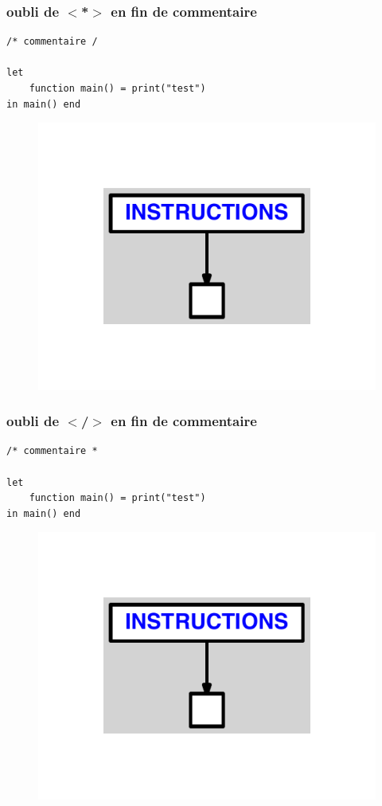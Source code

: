 \documentclass{article}
\begin{document}
\subsubsection{oubli de $ < $*$ > $ en fin de commentaire}
\begin{lstlisting}
/* commentaire /

let
	function main() = print("test")
in main() end
\end{lstlisting}
\newpage
\begin{figure}[H]
\centering
\includegraphics[max width=\textwidth]{ast/ast_147.pdf}
\end{figure}
\newpage
\subsubsection{oubli de $ < $/$ > $ en fin de commentaire}
\begin{lstlisting}
/* commentaire *

let
	function main() = print("test")
in main() end
\end{lstlisting}
\newpage
\begin{figure}[H]
\centering
\includegraphics[max width=\textwidth]{ast/ast_148.pdf}
\end{figure}
\newpage
\end{document}
